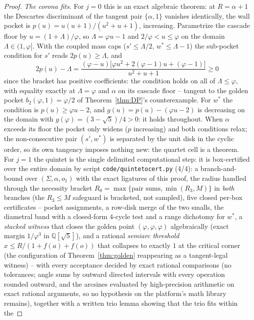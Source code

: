 \documentclass[11pt]{article}
\theoremstyle{definition}
\begin{document}
\begin{proof}
\emph{The corona fits.} For $j=0$ this is an exact algebraic
theorem: at $R=\alpha+1$ the Descartes discriminant of the tangent
pair $\{\alpha,1\}$ vanishes identically, the wall pocket is
$p(u)=u(u+1)/(u^{2}+u+1)$, increasing. Parametrize the cascade floor by
$u=(1+\Lambda)/\varphi$, so $\Lambda=\varphi u-1$ and
$2/\varphi<u\le\varphi$ on the domain $\Lambda\in(1,\varphi]$. With
the coupled mass caps ($s'\le\Lambda/2$, $w^{*}\le\Lambda-1$) the
sub-pocket condition for $s'$ reads $2p(u)\ge\Lambda$, and
\[
2p(u)-\Lambda=\frac{(\varphi-u)\bigl[\varphi u^{2}+2(\varphi-1)u
+(\varphi-1)\bigr]}{u^{2}+u+1}\ge0
\]
since the bracket has positive coefficients: the condition holds
on all of $\Lambda\le\varphi$, with equality exactly at
$\Lambda=\varphi$ and $\alpha$ on its cascade floor -- tangent to
the golden pocket $b_2(\varphi,1)=\varphi/2$ of
Theorem~\ref{thm:DP}'s counterexample. For $w^{*}$ the condition
is $p(u)\ge\varphi u-2$, and $g(u)=p(u)-(\varphi u-2)$ is
decreasing on the domain with
$g(\varphi)=(3-\sqrt5)/4>0$: it holds throughout. When
$\alpha$ exceeds its floor the pocket only widens ($p$
increasing) and both conditions relax; the non-consecutive pair
$(s',w^{*})$ is separated by the unit disk in the cyclic order,
so its own tangency imposes nothing new: the quartet cell is a
theorem. For
$j=1$ the quintet is the single delimited computational step: it is
box-certified over the entire domain by script
\texttt{code/quintetocert.py} (4/4): a branch-and-bound over
$(\Sigma,\alpha,o_1)$ with the exact ligatures of this proof, the
radius handled through the necessity bracket
$R_0=\max\{\text{pair sums},\min(R_3,M)\}$ in \emph{both}
branches (the $R_3\le M$ safeguard is bracketed, not sampled),
five closed per-box certificates -- pocket assignments, a
row-disk merge of the two smalls, the diametral band with a
closed-form $4$-cycle test and a range dichotomy for $w^{*}$, a
\emph{stacked witness} that closes the golden point
$(\varphi,\varphi,\varphi)$ algebraically (exact margin
$1/\varphi^{3}$ in $\mathbb Q[\sqrt5]$), and a rational
\emph{semiarc threshold} $x\le R/(1+f(a)+f(o))$ that collapses to
exactly $1$ at the critical corner (the configuration of
Theorem~\ref{thm:golden} reappearing as a tangent-legal witness)
-- with every acceptance decided by exact rational comparisons
(no tolerances; angle sums by outward directed intervals with
every operation rounded outward, and the arcsines evaluated by
high-precision arithmetic on exact rational arguments, so no
hypothesis on the platform's math library remains), together
with a written trio lemma showing that the trio fits within the

\end{proof}
\end{document}
